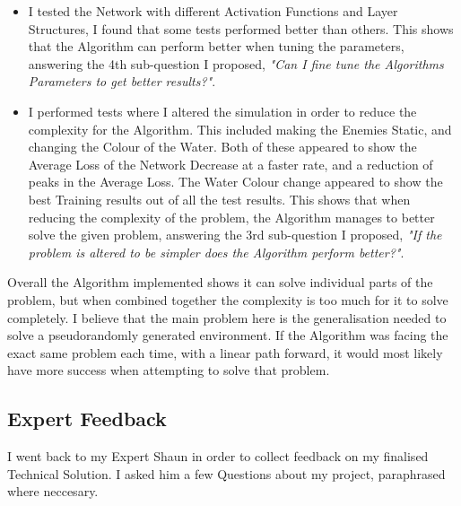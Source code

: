 \begin{flushleft}
\begin{itemize}
            \item I tested the Network with different Activation Functions and Layer Structures, I found that some tests performed better than others.
            This shows that the Algorithm can perform better when tuning the parameters, answering the 4th sub-question I proposed, 
            \textit{"Can I fine tune the Algorithms Parameters to get better results?"}. \\
            \vspace{0.2cm}

            \item I performed tests where I altered the simulation in order to reduce the complexity for the Algorithm. This included making the 
            Enemies Static, and changing the Colour of the Water. Both of these appeared to show the Average Loss of the Network Decrease at
            a faster rate, and a reduction of peaks in the Average Loss. The Water Colour change appeared to show the best Training results out of all
            the test results. This shows that when reducing the complexity of the problem, the Algorithm manages to better solve the given problem,
            answering the 3rd sub-question I proposed, \textit{"If the problem is altered to be simpler does the Algorithm perform better?"}.\\
            \vspace{0.2cm}
        \end{itemize}

        Overall the Algorithm implemented shows it can solve individual parts of the problem, but when combined together the complexity
        is too much for it to solve completely. I believe that the main problem here is the generalisation needed to solve a pseudorandomly
        generated environment. If the Algorithm was facing the exact same problem each time, with a linear path forward, it would most likely
        have more success when attempting to solve that problem.

    \subsection{Expert Feedback}
        \vspace{0.2cm}
        I went back to my Expert Shaun in order to collect feedback on my finalised Technical Solution. I asked him a few Questions about my
        project, paraphrased where neccesary. \\
        \vspace{0.5cm}


\end{flushleft}
